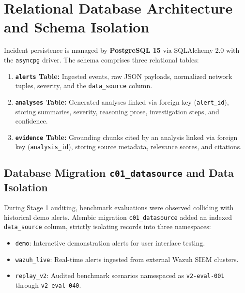\section{Relational Database Architecture and Schema Isolation}
\label{sec:database_arch}
Incident persistence is managed by \textbf{PostgreSQL 15} via SQLAlchemy 2.0 with the \texttt{asyncpg} driver. The schema comprises three relational tables:
\begin{enumerate}[itemsep=1pt,topsep=2pt]
  \item \textbf{\texttt{alerts} Table:} Ingested events, raw JSON payloads, normalized network tuples, severity, and the \texttt{data\_source} column.
  \item \textbf{\texttt{analyses} Table:} Generated analyses linked via foreign key (\texttt{alert\_id}), storing summaries, severity, reasoning prose, investigation steps, and confidence.
  \item \textbf{\texttt{evidence} Table:} Grounding chunks cited by an analysis linked via foreign key (\texttt{analysis\_id}), storing source metadata, relevance scores, and citations.
\end{enumerate}

\subsection{Database Migration \texttt{c01\_datasource} and Data Isolation}
During Stage 1 auditing, benchmark evaluations were observed colliding with historical demo alerts. Alembic migration \texttt{c01\_datasource} added an indexed \texttt{data\_source} column, strictly isolating records into three namespaces:
\begin{itemize}[itemsep=1pt,topsep=2pt]
  \item \texttt{demo}: Interactive demonstration alerts for user interface testing.
  \item \texttt{wazuh\_live}: Real-time alerts ingested from external Wazuh SIEM clusters.
  \item \texttt{replay\_v2}: Audited benchmark scenarios namespaced as \texttt{v2-eval-001} through \texttt{v2-eval-040}.
\end{itemize}

